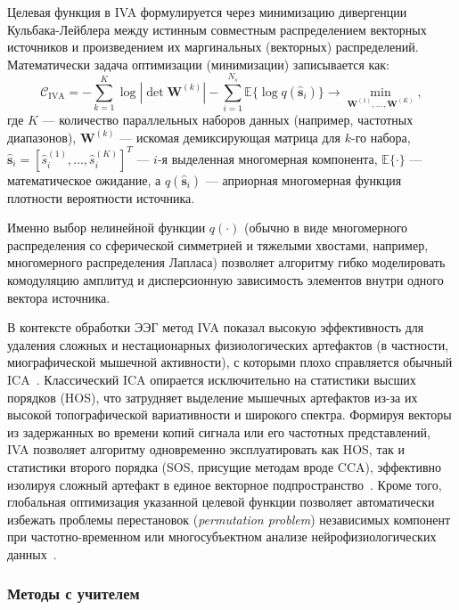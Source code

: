 Целевая функция в IVA формулируется через минимизацию дивергенции Кульбака-Лейблера между истинным совместным распределением векторных источников и произведением их маргинальных (векторных) распределений. Математически задача оптимизации (минимизации) записывается как:
\begin{equation}
	\mathcal{C}_{\text{IVA}} = - \sum_{k=1}^{K} \log |\det \mathbf{W}^{(k)}| - \sum_{i=1}^{N_s} \mathbb{E} \{\log q(\hat{\mathbf{s}}_i)\} \rightarrow \min_{\mathbf{W}^{(1)}, \dots, \mathbf{W}^{(K)}},
\end{equation}
где $K$ --- количество параллельных наборов данных (например, частотных диапазонов), $\mathbf{W}^{(k)}$ --- искомая демиксирующая матрица для $k$-го набора, $\hat{\mathbf{s}}_i = [\hat{s}_i^{(1)}, \dots, \hat{s}_i^{(K)}]^T$ --- $i$-я выделенная многомерная компонента, $\mathbb{E}\{\cdot\}$ --- математическое ожидание, а $q(\hat{\mathbf{s}}_i)$ --- априорная многомерная функция плотности вероятности источника. 

Именно выбор нелинейной функции $q(\cdot)$ (обычно в виде многомерного распределения со сферической симметрией и тяжелыми хвостами, например, многомерного распределения Лапласа) позволяет алгоритму гибко моделировать комодуляцию амплитуд и дисперсионную зависимость элементов внутри одного вектора источника.

В контексте обработки ЭЭГ метод IVA показал высокую эффективность для удаления сложных и нестационарных физиологических артефактов (в частности, миографической мышечной активности), с которыми плохо справляется обычный ICA~\cite{Chen2017}. Классический ICA опирается исключительно на статистики высших порядков (HOS), что затрудняет выделение мышечных артефактов из-за их высокой топографической вариативности и широкого спектра. Формируя векторы из задержанных во времени копий сигнала или его частотных представлений, IVA позволяет алгоритму одновременно эксплуатировать как HOS, так и статистики второго порядка (SOS, присущие методам вроде CCA), эффективно изолируя сложный артефакт в единое векторное подпространство~\cite{Chen2017}. Кроме того, глобальная оптимизация указанной целевой функции позволяет автоматически избежать проблемы перестановок (\textit{permutation problem}) независимых компонент при частотно-временном или многосубъектном анализе нейрофизиологических данных~\cite{Kim2006IVA}.

\subsubsection{Методы с учителем}
\label{sec:supervised_methods}

